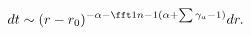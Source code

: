 \begin{equation}
dt\sim (r-r_0)^{-\alpha-\fft1{n-1}(\alpha+\sum\gamma_a-1)}dr.
\label{eq:trrel}
\end{equation}


